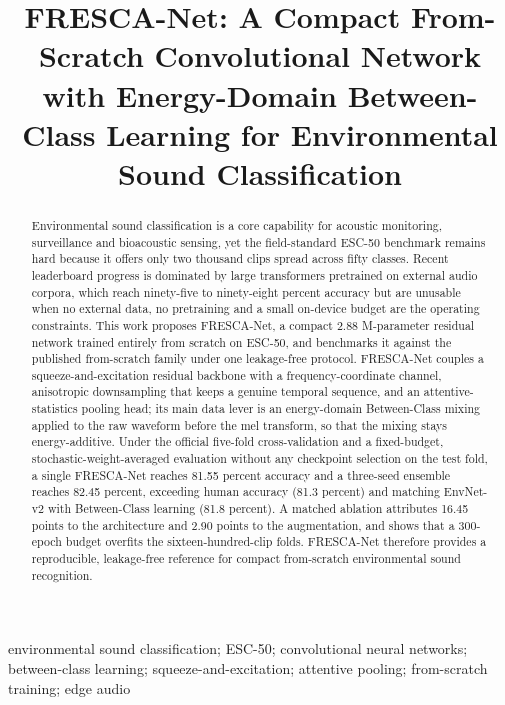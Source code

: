 \documentclass[conference]{IEEEtran}
\begin{document}
\title{FRESCA-Net: A Compact From-Scratch Convolutional Network with Energy-Domain Between-Class Learning for Environmental Sound Classification}

\author{
}

\maketitle

\begin{abstract}
Environmental sound classification is a core capability for acoustic monitoring, surveillance and bioacoustic sensing, yet the field-standard ESC-50 benchmark remains hard because it offers only two thousand clips spread across fifty classes. Recent leaderboard progress is dominated by large transformers pretrained on external audio corpora, which reach ninety-five to ninety-eight percent accuracy but are unusable when no external data, no pretraining and a small on-device budget are the operating constraints. This work proposes FRESCA-Net, a compact 2.88 M-parameter residual network trained entirely from scratch on ESC-50, and benchmarks it against the published from-scratch family under one leakage-free protocol. FRESCA-Net couples a squeeze-and-excitation residual backbone with a frequency-coordinate channel, anisotropic downsampling that keeps a genuine temporal sequence, and an attentive-statistics pooling head; its main data lever is an energy-domain Between-Class mixing applied to the raw waveform before the mel transform, so that the mixing stays energy-additive. Under the official five-fold cross-validation and a fixed-budget, stochastic-weight-averaged evaluation without any checkpoint selection on the test fold, a single FRESCA-Net reaches 81.55 percent accuracy and a three-seed ensemble reaches 82.45 percent, exceeding human accuracy (81.3 percent) and matching EnvNet-v2 with Between-Class learning (81.8 percent). A matched ablation attributes 16.45 points to the architecture and 2.90 points to the augmentation, and shows that a 300-epoch budget overfits the sixteen-hundred-clip folds. FRESCA-Net therefore provides a reproducible, leakage-free reference for compact from-scratch environmental sound recognition.
\end{abstract}

\begin{IEEEkeywords}
environmental sound classification; ESC-50; convolutional neural networks; between-class learning; squeeze-and-excitation; attentive pooling; from-scratch training; edge audio
\end{IEEEkeywords}
\end{document}
